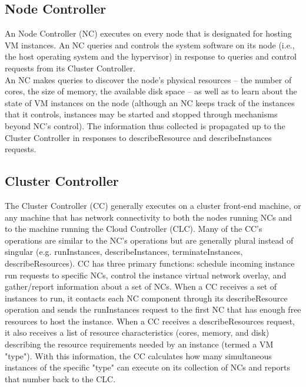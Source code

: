 \subsection{Node Controller}
An Node Controller (NC) executes on every node that is designated for hosting VM instances. An NC queries and controls the system 
software on its node (i.e., the host operating system and the hypervisor) in response to queries and control requests from its 
Cluster Controller.\\ 
An NC makes queries to discover the node’s physical resources – the number of cores, the size of memory, the available 
disk space – as well as to learn about the state of VM instances on the node (although an NC keeps track of the instances that it controls, 
instances may be started and stopped through mechanisms beyond NC’s control). The information thus collected is propagated up to the 
Cluster Controller in responses to describeResource and describeInstances requests.
\subsection{Cluster Controller}
The Cluster Controller (CC) generally executes on a cluster front-end machine, or any machine that has network connectivity to both the 
nodes running NCs and to the machine running the Cloud Controller (CLC). Many of the CC's operations are similar to the NC's operations 
but are generally plural instead of singular (e.g. runInstances, describeInstances, terminateInstances, describeResources). CC has 
three primary functions: schedule incoming instance run requests to specific NCs, control the instance virtual network overlay, and 
gather/report information about a set of NCs. When a CC receives a set of instances to run, it contacts each NC component through 
its describeResource operation and sends the runInstances request to the first NC that has enough free resources to host the instance. 
When a CC receives a describeResources request, it also receives a list of resource characteristics (cores, memory, and disk) 
describing the resource requirements needed by an instance (termed a VM "type"). With this information, the CC calculates how 
many simultaneous instances of the specific "type" can execute on its collection of NCs and reports that number back to the CLC.
